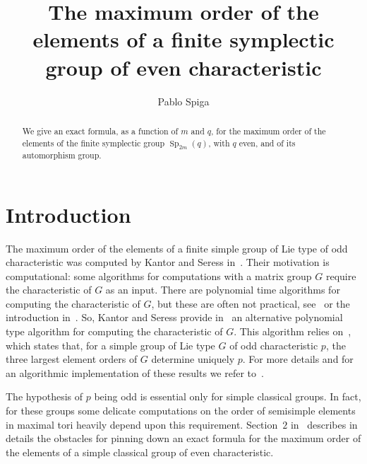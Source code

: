 \documentclass{amsart}
\begin{document}
\title[Maximal element order of symplectic groups]{The maximum order of the elements  of a finite symplectic group of even characteristic}
\author[P. Spiga]{Pablo Spiga}
\address{Pablo Spiga, Dipartimento di Matematica Pura e Applicata,\newline
 University of Milano-Bicocca, Via Cozzi 53, 20126 Milano, Italy} 


\begin{abstract}
We give an exact formula, as a function of $m$ and $q$, for the maximum order of the elements of the finite symplectic group ${\mathop{\mathrm{Sp}}}_{2m}(q)$, with $q$ even, and of its automorphism group.
\end{abstract}
\maketitle 

\section{Introduction}

The maximum order of the elements of a finite simple group of Lie type of odd characteristic was computed by Kantor and Seress in~\cite{KS}. Their motivation is computational: some algorithms for computations with a matrix group $G$ require the characteristic of $G$ as an input. There are polynomial time algorithms for computing the characteristic of $G$, but these are often not practical, see~\cite{KS2} or the introduction in~\cite{KS}. So, Kantor and Seress provide in~\cite{KS} an alternative polynomial type algorithm for computing the characteristic of $G$. This algorithm relies on~\cite[Theorem~$1.2$]{KS}, which states that, for a simple group of Lie type $G$ of odd characteristic $p$,  the three largest element orders of $G$ determine uniquely $p$. For more details and for an algorithmic implementation of these results we refer to~\cite{KS}.

The hypothesis of $p$ being odd is essential only for simple classical groups. In fact, for these groups some delicate computations on the order of semisimple elements in maximal tori heavily depend upon this requirement. Section~$2$ in~\cite{KS} describes in details the obstacles for pinning down an exact formula for the maximum order of the elements of a simple classical group of even characteristic. 
\end{document}

